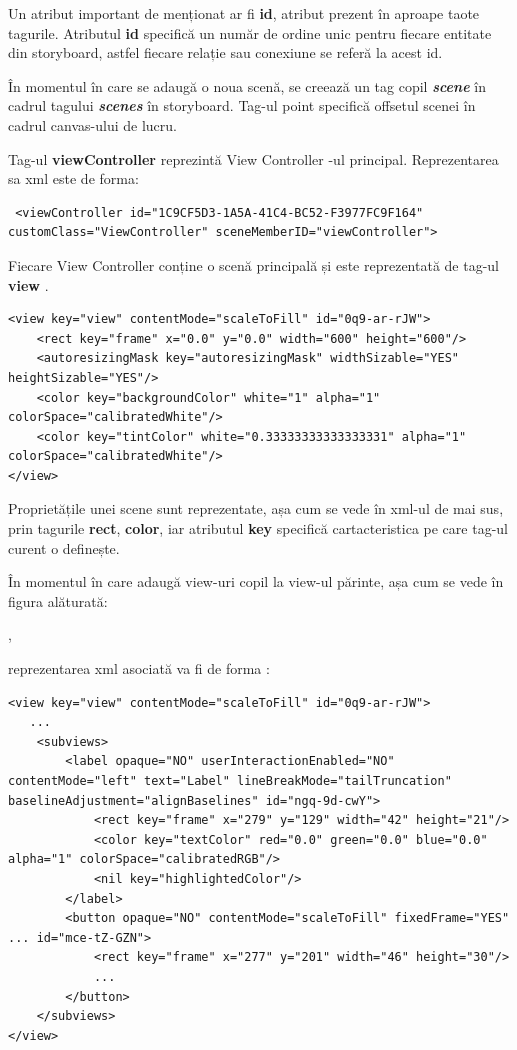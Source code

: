Un atribut important de menționat ar fi \textbf{id}, atribut prezent în aproape taote tagurile. Atributul \textbf{id} specifică un număr de ordine unic pentru fiecare entitate din storyboard, 
astfel fiecare relație sau conexiune se referă la acest id.

În momentul în care se adaugă o noua scenă, se creează un tag copil \textbf{\textit{scene}} în cadrul tagului \textbf{\textit{scenes}} în storyboard. Tag-ul point specifică offsetul scenei în cadrul canvas-ului de lucru.

Tag-ul \textbf{viewController} reprezintă View Controller -ul principal. Reprezentarea sa xml este de forma:

\lstset{language=XML}
\begin{lstlisting}
 <viewController id="1C9CF5D3-1A5A-41C4-BC52-F3977FC9F164" customClass="ViewController" sceneMemberID="viewController">
\end{lstlisting}

Fiecare View Controller conține o scenă principală și este reprezentată de tag-ul \textbf{view} . 

\lstset{language=XML}
\begin{lstlisting}
<view key="view" contentMode="scaleToFill" id="0q9-ar-rJW">
    <rect key="frame" x="0.0" y="0.0" width="600" height="600"/>
    <autoresizingMask key="autoresizingMask" widthSizable="YES" heightSizable="YES"/>
    <color key="backgroundColor" white="1" alpha="1" colorSpace="calibratedWhite"/>
    <color key="tintColor" white="0.33333333333333331" alpha="1" colorSpace="calibratedWhite"/>
</view>
\end{lstlisting}

Proprietățile unei scene sunt reprezentate, așa cum se vede în xml-ul de mai sus, prin tagurile \textbf{rect}, \textbf{color}, iar atributul \textbf{key} specifică cartacteristica pe care tag-ul curent o definește.

În momentul în care adaugă view-uri copil la view-ul părinte, așa cum se vede în figura alăturată:

 , 


reprezentarea xml asociată va fi de forma :
\lstset{language=XML}
\begin{lstlisting}
<view key="view" contentMode="scaleToFill" id="0q9-ar-rJW">
   ...
    <subviews>
        <label opaque="NO" userInteractionEnabled="NO" contentMode="left" text="Label" lineBreakMode="tailTruncation" baselineAdjustment="alignBaselines" id="ngq-9d-cwY">
            <rect key="frame" x="279" y="129" width="42" height="21"/>
            <color key="textColor" red="0.0" green="0.0" blue="0.0" alpha="1" colorSpace="calibratedRGB"/>
            <nil key="highlightedColor"/>
        </label>
        <button opaque="NO" contentMode="scaleToFill" fixedFrame="YES" ... id="mce-tZ-GZN">
            <rect key="frame" x="277" y="201" width="46" height="30"/>
            ...
        </button>
    </subviews>
</view>
\end{lstlisting}

